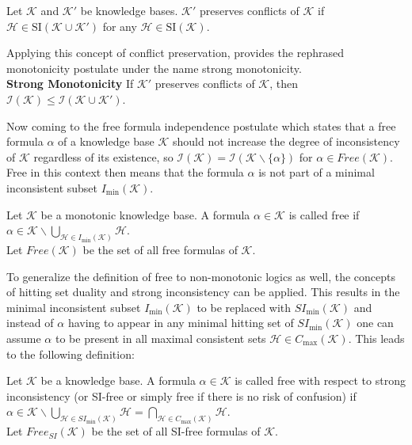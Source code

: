 \begin{definition}
    Let \(\mathcal{K}\) and \(\mathcal{K}'\) be knowledge bases. \(\mathcal{K}'\) preserves conflicts of \(\mathcal{K}\) if \(\mathcal{H} \in \text{SI}(\mathcal{K} \cup \mathcal{K}')\) for any \(\mathcal{H} \in \text{SI}(\mathcal{K})\).
\end{definition}

Applying this concept of conflict preservation, \cite{ulbricht_handling_2020} provides the rephrased monotonicity postulate under the name strong monotonicity.
\\
\textbf{Strong Monotonicity}
If \(\mathcal{K}'\) preserves conflicts of \(\mathcal{K}\), then \(\mathcal{I}(\mathcal{K}) \leq \mathcal{I}(\mathcal{K \cup \mathcal{K}'})\).

Now coming to the free formula independence postulate which states that a free formula \(\alpha\) of a knowledge base \(\mathcal{K}\) should not increase the degree of inconsistency of \(\mathcal{K}\) regardless of its existence, so \(\mathcal{I}(\mathcal{K}) = \mathcal{I}(\mathcal{K} \backslash \{\alpha\})\) for \(\alpha \in Free(\mathcal{K})\). Free in this context then means that the formula \(\alpha\) is not part of a minimal inconsistent subset \(I_{\min}(\mathcal{K})\).

\begin{definition}
    Let \(\mathcal{K}\) be a monotonic knowledge base. A formula \(\alpha \in \mathcal{K}\) is called free if\\
    \(\alpha \in \mathcal{K} \backslash \bigcup\limits_{\mathcal{H} \in I_{\min}(\mathcal{K})} \mathcal{H}\).\\
    Let \(Free(\mathcal{K})\) be the set of all free formulas of \(\mathcal{K}\).
\end{definition}

To generalize the definition of free to non-monotonic logics as well, the concepts of hitting set duality and strong inconsistency can be applied. This results in the minimal inconsistent subset \(I_{\min}(\mathcal{K})\) to be replaced with \(SI_{\min}(\mathcal{K})\) and instead of \(\alpha\) having to appear in any minimal hitting set of \(SI_{\min}(\mathcal{K})\) one can assume \(\alpha\) to be present in all maximal consistent sets \(\mathcal{H} \in C_{\max}(\mathcal{K})\). This leads to the following definition:

\begin{definition}
    Let \(\mathcal{K}\) be a knowledge base. A formula \(\alpha \in \mathcal{K}\) is called free with respect to strong inconsistency (or SI-free or simply free if there is no risk of confusion) if\\
    \(\alpha \in \mathcal{K} \backslash \bigcup\limits_{\mathcal{H} \in SI_{\min}(\mathcal{K})} \mathcal{H} = \bigcap\limits_{\mathcal{H} \in C_{\max}(\mathcal{K})} \mathcal{H}\).\\
    Let \(Free_{SI}(\mathcal{K})\) be the set of all SI-free formulas of \(\mathcal{K}\).
\end{definition}

